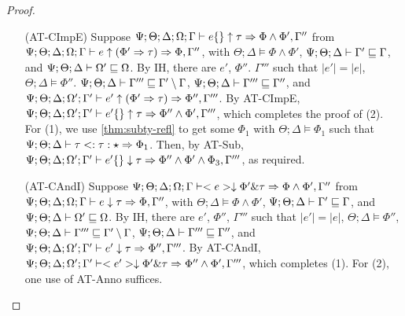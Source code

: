 \begin{proof}
\begin{itemize}
  \item[(AT-CImpE)] Suppose $\Psi ; \Theta ; \Delta ; \Omega ; \Gamma \vdash e \{\} \uparrow \tau \Rightarrow \Phi \wedge \Phi',\Gamma''$ from
  $\Psi ; \Theta ; \Delta ; \Omega ; \Gamma \vdash e \uparrow (\Phi' \Rightarrow \tau) \Rightarrow \Phi,\Gamma''$, with
  $\Theta ; \Delta \vDash \Phi \wedge \Phi'$,
  $\Psi ; \Theta ; \Delta \vdash \Gamma' \sqsubseteq \Gamma$, and
  $\Psi ; \Theta ; \Delta \vdash \Omega' \sqsubseteq \Omega$.
  By IH, there are $e'$, $\Phi''$. $\Gamma'''$ such that
  $|e'| = |e|$,
  $\Theta ; \Delta \vDash \Phi''$.
  $\Psi ; \Theta ; \Delta \vdash \Gamma''' \sqsubseteq \Gamma' \setminus \Gamma$,
  $\Psi ; \Theta ; \Delta \vdash \Gamma''' \sqsubseteq \Gamma''$, and
  $\Psi ; \Theta ; \Delta ; \Omega' ; \Gamma' \vdash e' \uparrow (\Phi' \Rightarrow \tau) \Rightarrow \Phi'',\Gamma'''$.
  By AT-CImpE,
  $\Psi ; \Theta ; \Delta ; \Omega' ; \Gamma' \vdash e' \{\} \uparrow \tau \Rightarrow \Phi'' \wedge \Phi',\Gamma'''$,
  which completes the proof of (2). For (1), we use \autoref{thm:subty-refl} to get some $\Phi_1$ with $\Theta ; \Delta \vDash \Phi_1$
  such that $\Psi ; \Theta ; \Delta \vdash \tau <: \tau : \star \Rightarrow \Phi_1$.
  Then, by AT-Sub,
  $\Psi ; \Theta ; \Delta ; \Omega' ; \Gamma' \vdash e' \{\} \downarrow \tau \Rightarrow \Phi'' \wedge \Phi' \wedge \Phi_3,\Gamma'''$, as required.
  
  \item[(AT-CAndI)] Suppose $\Psi ; \Theta ; \Delta ; \Omega ; \Gamma \vdash <e> \downarrow \Phi' \& \tau \Rightarrow \Phi \wedge \Phi',\Gamma''$ from
  $\Psi ; \Theta ; \Delta ; \Omega ; \Gamma \vdash e \downarrow \tau \Rightarrow \Phi,\Gamma''$, with
  $\Theta ; \Delta \vDash \Phi \wedge \Phi'$,
  $\Psi ; \Theta ; \Delta \vdash \Gamma' \sqsubseteq \Gamma$, and
  $\Psi ; \Theta ; \Delta \vdash \Omega' \sqsubseteq \Omega$.
  By IH, there are $e'$, $\Phi''$, $\Gamma'''$ such that
  $|e'| = |e|$,
  $\Theta ; \Delta \vDash \Phi''$,
  $\Psi ; \Theta ; \Delta \vdash \Gamma''' \sqsubseteq \Gamma' \setminus \Gamma$,
  $\Psi ; \Theta ; \Delta \vdash \Gamma''' \sqsubseteq \Gamma''$, and
  $\Psi ; \Theta ; \Delta ; \Omega' ; \Gamma' \vdash e' \downarrow \tau \Rightarrow \Phi'', \Gamma'''$.
  By AT-CAndI,
  $\Psi ; \Theta ; \Delta ; \Omega' ; \Gamma' \vdash <e'> \downarrow \Phi' \& \tau \Rightarrow \Phi'' \wedge \Phi',\Gamma'''$,
  which completes (1). For (2), one use of AT-Anno suffices.
  

\end{itemize}
\end{proof}
